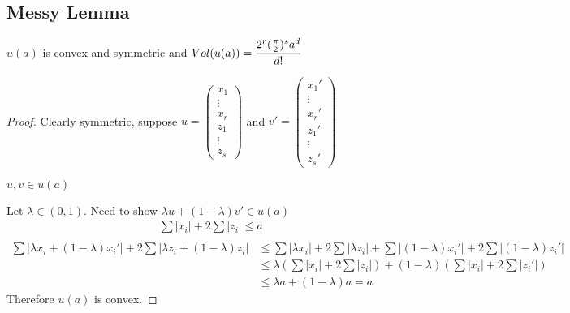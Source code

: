 \documentclass[11pt]{article}
\begin{document}
\subsection{Messy Lemma}
\begin{lemma}
	$u(a)$ is convex and symmetric and $Vol(u(a)) = \cfrac{2^r (\frac{\pi}{2})^s a^d }{d!}$
\end{lemma}



\begin{proof}
	Clearly symmetric, suppose $u = \begin{pmatrix}
		x_1\\
		\vdots\\
		x_r\\
		z_1\\
		\vdots\\
		z_s
	\end{pmatrix}$ and $v' = \begin{pmatrix}
x_1'\\
		\vdots\\
		x_r'\\
		z_1'\\
		\vdots\\
		z_s'
	\end{pmatrix}$

	$u, v \in u(a) $ 

	Let $\lambda \in (0,1)$.
	Need to show $\lambda u + (1-\lambda) v' \in u(a) $
	\begin{align*}
\sum |x_i| + 2 \sum |z_i| \leq a\\
	\end{align*}
	\begin{align*}
		\sum|\lambda x_i + (1-\lambda)x_i'| + 2\sum|\lambda z_i + (1-\lambda)z_i| & \leq \sum |\lambda x_i| + 2\sum|\lambda z_i| + \sum|(1-\lambda)x_i'| + 2\sum|(1-\lambda)z_i'| \\
		& \leq \lambda (\sum |x_i| + 2\sum|z_i|) + (1-\lambda)(\sum |x_i| + 2 \sum |z_i'|)\\
		& \leq \lambda a + (1-\lambda)a = a
	\end{align*}
	Therefore $u(a)$ is convex.



\end{proof}
\end{document}
